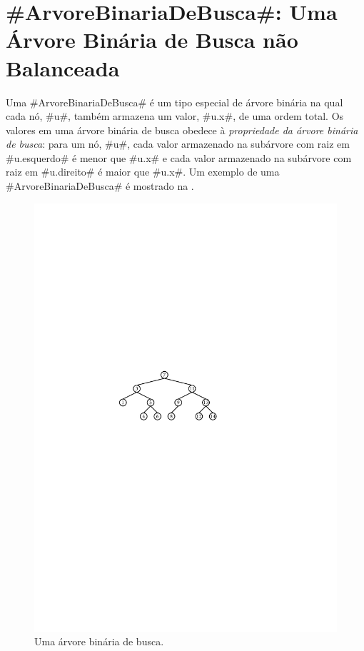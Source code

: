 \section{#ArvoreBinariaDeBusca#: Uma Árvore Binária de Busca não Balanceada}

%
%
%
Uma #ArvoreBinariaDeBusca# é um tipo especial de árvore binária na qual cada nó, #u#,
também armazena um valor, #u.x#, de uma ordem total.  Os valores em uma árvore binária de busca obedece à \emph{propriedade da árvore binária de busca}:
%
para um nó, #u#, cada valor armazenado na subárvore com raiz em #u.esquerdo# é menor que #u.x# e cada valor armazenado na subárvore com raiz em
#u.direito# é maior que #u.x#.  Um exemplo de uma #ArvoreBinariaDeBusca# é mostrado na .

\begin{figure}
  \begin{center}
    \includegraphics[scale=0.90909]{figs/bst-example}
  \end{center}
  \caption{Uma árvore binária de busca.}
\end{figure}


